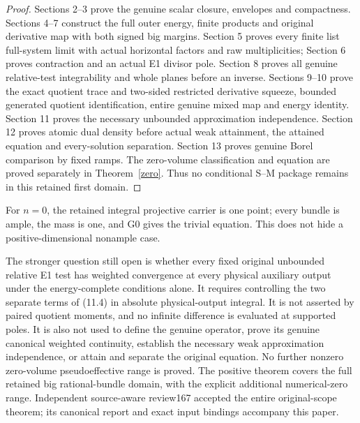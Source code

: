 \documentclass[10pt]{article}
\begin{document}
\begin{proof}
Sections 2--3 prove the genuine scalar closure, envelopes and compactness.
Sections 4--7 construct the full outer energy, finite products and original
derivative map with both signed big margins. Section 5 proves every finite
list full-system limit with actual horizontal factors and raw multiplicities;
Section 6 proves contraction and an actual E1 divisor pole. Section 8 proves
all genuine relative-test integrability and whole planes before an inverse.
Sections 9--10 prove the exact quotient trace and two-sided restricted
derivative squeeze, bounded generated quotient identification, entire genuine
mixed map and energy identity. Section 11 proves the necessary unbounded
approximation independence. Section 12 proves atomic dual density before
actual weak attainment, the attained equation and every-solution separation.
Section 13 proves genuine Borel comparison by fixed ramps. The zero-volume
classification and equation are proved separately in Theorem~\ref{zero}.
Thus no conditional S--M package remains in this retained first domain.
\end{proof}

For $n=0$, the retained integral projective carrier is one point; every
bundle is ample, the mass is one, and G0 gives the trivial equation. This
does not hide a positive-dimensional nonample case.

The stronger question still open is whether every fixed
original unbounded relative E1 test has weighted convergence at every
physical auxiliary output under the energy-complete conditions alone.
It requires controlling the two separate terms of (11.4) in absolute
physical-output integral. It is not asserted by paired quotient moments,
and no infinite difference is evaluated at supported poles. It is also
not used to define the genuine operator, prove its genuine canonical
weighted continuity, establish the necessary weak approximation
independence, or attain and separate the original equation. No further
nonzero zero-volume pseudoeffective range is proved. The positive theorem covers the full retained big rational-bundle
domain, with the explicit additional numerical-zero range. Independent
source-aware review167 accepted the entire original-scope theorem;
its canonical report and exact input bindings accompany this paper.

\appendix
\end{document}
